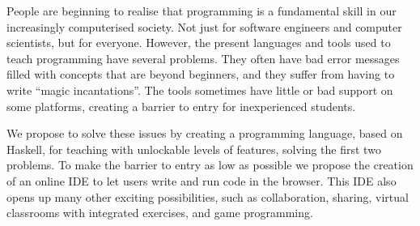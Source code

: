 People are beginning to realise that programming is a fundamental skill in our
increasingly computerised society.  Not just for software engineers and
computer scientists, but for everyone. However, the present languages and tools
used to teach programming have several problems. They often have bad error
messages filled with concepts that are beyond beginners, and they suffer from
having to write ``magic incantations''.  The tools sometimes have little or bad
support on some platforms, creating a barrier to entry for inexperienced
students.

We propose to solve these issues by creating a programming language, based on
Haskell, for teaching with unlockable levels of features, solving the first two
problems. To make the barrier to entry as low as possible we propose the
creation of an online IDE to let users write and run code in the browser.  This
IDE also opens up many other exciting possibilities, such as collaboration,
sharing, virtual classrooms with integrated exercises, and game programming.
